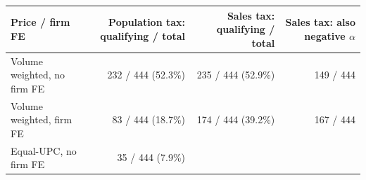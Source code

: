 \documentclass[10pt,]{article}
\begin{document}
\begin{longtable}[]{@{}lrrr@{}}
\toprule
\begin{minipage}[b]{0.27\columnwidth}\raggedright\strut
Price / firm FE\strut
\end{minipage} & \begin{minipage}[b]{0.20\columnwidth}\raggedleft\strut
Population tax: qualifying / total\strut
\end{minipage} & \begin{minipage}[b]{0.20\columnwidth}\raggedleft\strut
Sales tax: qualifying / total\strut
\end{minipage} & \begin{minipage}[b]{0.20\columnwidth}\raggedleft\strut
Sales tax: also negative \(\alpha\)\strut
\end{minipage}\tabularnewline
\midrule
\endhead
\begin{minipage}[t]{0.27\columnwidth}\raggedright\strut
Volume weighted, no firm FE\strut
\end{minipage} & \begin{minipage}[t]{0.20\columnwidth}\raggedleft\strut
232 / 444 (52.3\%)\strut
\end{minipage} & \begin{minipage}[t]{0.20\columnwidth}\raggedleft\strut
235 / 444 (52.9\%)\strut
\end{minipage} & \begin{minipage}[t]{0.20\columnwidth}\raggedleft\strut
149 / 444\strut
\end{minipage}\tabularnewline
\begin{minipage}[t]{0.27\columnwidth}\raggedright\strut
Volume weighted, firm FE\strut
\end{minipage} & \begin{minipage}[t]{0.20\columnwidth}\raggedleft\strut
83 / 444 (18.7\%)\strut
\end{minipage} & \begin{minipage}[t]{0.20\columnwidth}\raggedleft\strut
174 / 444 (39.2\%)\strut
\end{minipage} & \begin{minipage}[t]{0.20\columnwidth}\raggedleft\strut
167 / 444\strut
\end{minipage}\tabularnewline
\begin{minipage}[t]{0.27\columnwidth}\raggedright\strut
Equal-UPC, no firm FE\strut
\end{minipage} & \begin{minipage}[t]{0.20\columnwidth}\raggedleft\strut
35 / 444 (7.9\%)\strut

\end{minipage}
\end{longtable}
\end{document}
